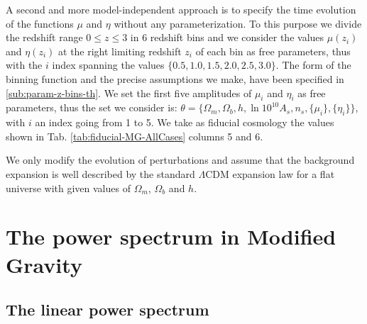 A second and more model-independent approach
is to specify the time evolution of the functions $\mu$ and $\eta$ without
any parameterization. To this purpose we divide the redshift
range $0\leq z\leq3$ in 6 redshift bins and we consider the values
$\mu(z_{i})$ and $\eta(z_{i})$ at the right limiting redshift $z_{i}$
of each bin as free parameters, thus with the $i$ index spanning the values
$\{0.5,1.0,1.5,2.0,2.5,3.0\}$. 
The form of the binning function and the precise assumptions we make, have been specified in \cref{sub:param-z-bins-th}.
We set the first five amplitudes of $\mu_{i}$ and $\eta_{i}$ as
free parameters, thus the set we consider is:
$\theta=\{\Omega_{m},\Omega_{b},h,\ln10^{10} A_{s},n_{s},\{\mu_{i}\},\{\eta_{i}\}\}$,
with $i$ an index going from 1 to 5. We take as fiducial cosmology
the values shown in Tab. \ref{tab:fiducial-MG-AllCases} columns 5
and 6. 

We only modify the evolution of perturbations and assume that
the background expansion is well described by the standard $\Lambda$CDM
expansion law for a flat universe with given values of $\Omega_{m}$,
$\Omega_{b}$ and $h$.




\section{\label{sec:The-non-linear-power}The power spectrum in Modified
Gravity}


\subsection{The linear power spectrum}

